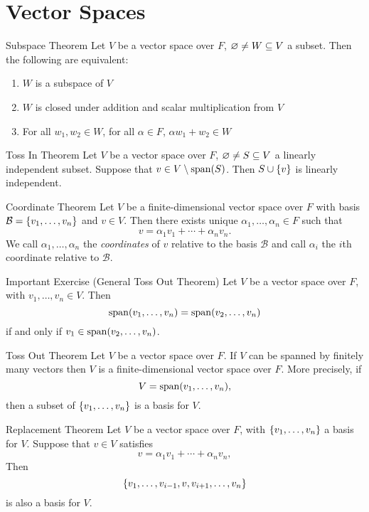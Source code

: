 \documentclass[class=article, crop=false]{standalone}
\begin{document}
  \tableofcontents\newpage
  \section{Vector Spaces}
  \begin{theorem}{Subspace Theorem}
    Let $V$ be a vector space over $F$, $\varnothing\neq W\subseteq V$ a subset. Then the following are equivalent:
    \begin{enumerate}[label=(\alph*)]
      \item $W$ is a subspace of $V$
      \item $W$ is closed under addition and scalar multiplication from $V$
      \item For all $w_1,w_2\in W$, for all $\alpha\in F$, $\alpha w_1+w_2\in W$
    \end{enumerate}
  \end{theorem}
  \begin{theorem}{Toss In Theorem}
    Let $V$ be a vector space over $F$, $\varnothing\neq S\subseteq V$ a linearly independent subset. Suppose that $v\in V\setminus \operatorname{span}(S)$. Then $S\cup \left\{v\right\}$ is linearly independent.
  \end{theorem}
  \begin{theorem}{Coordinate Theorem}
    Let $V$ be a finite-dimensional vector space over $F$ with basis $\mathcal{B} = \left\{v_1,\dotsc,v_n\right\}$ and $v\in V$. Then there exists unique $\alpha_1,\dotsc,\alpha_n\in F$ such that
    \[
      v = \alpha_1v_1 + \dotsb + \alpha_nv_n.
    \]
    We call $\alpha_1,\dotsc,\alpha_n$ the \emph{coordinates} of $v$ relative to the basis $\mathcal{B}$ and call $\alpha_i$ the $i$th coordinate relative to $\mathcal{B}$.
  \end{theorem}
  \begin{theorem}{Important Exercise (General Toss Out Theorem)}
    Let $V$ be a vector space over $F$, with $v_1,\dotsc,v_n\in V$. Then
    \[
      \operatorname{span}(v_1,\dotsc,v_n) = \operatorname{span}(v_2,\dotsc,v_n)
    \]
    if and only if $v_1\in \operatorname{span}(v_2,\dotsc,v_n)$.
  \end{theorem}
  \begin{theorem}{Toss Out Theorem}
    Let $V$ be a vector space over $F$. If $V$ can be spanned by finitely many vectors then $V$ is a finite-dimensional vector space over $F$. More precisely, if 
    \[
      V = \operatorname{span}(v_1,\dotsc,v_n),
    \]
    then a subset of $\left\{v_1,\dotsc,v_n\right\}$ is a basis for $V$.
  \end{theorem}
  \begin{theorem}{Replacement Theorem}
    Let $V$ be a vector space over $F$, with $\left\{v_1,\dotsc,v_n\right\}$ a basis for $V$. Suppose that $v\in V$ satisfies
    \[
      v = \alpha_1v_1 + \dotsb + \alpha_nv_n, \tag*{$\alpha_1,\dotsc,\alpha_n\in F, \alpha_i\neq 0$}
    \]
    Then
    \[
      \left\{v_1,\dotsc,v_{i-1},v,v_{i+1},\dotsc,v_n\right\}
    \]
    is also a basis for $V$.
  \end{theorem}
\end{document}
